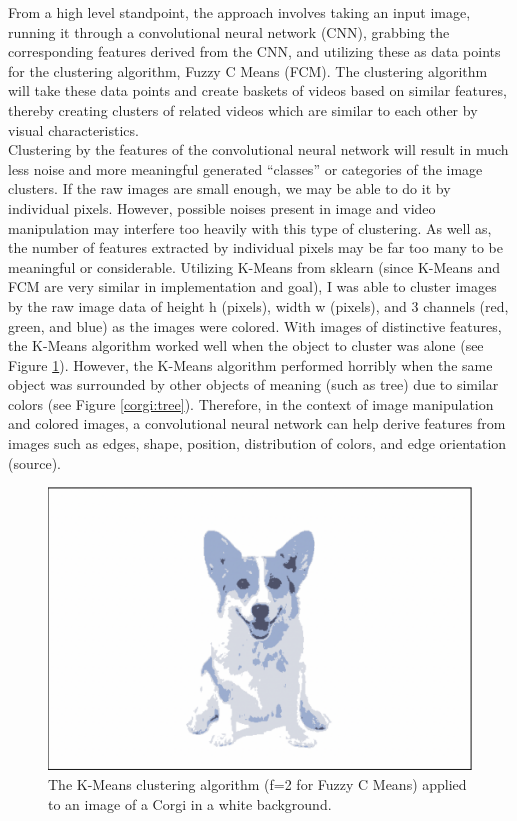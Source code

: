 \documentclass[10pt,twocolumn]{article}
\begin{document}
From a high level standpoint, the approach involves taking an input image, running it through a convolutional neural network (CNN), grabbing the corresponding features derived from the CNN, and utilizing these as data points for the clustering algorithm, Fuzzy C Means (FCM). The clustering algorithm will take these data points and create baskets of videos based on similar features, thereby creating clusters of related videos which are similar to each other by visual characteristics. \\
\indent Clustering by the features of the convolutional neural network will result in much less noise and more meaningful generated “classes” or categories of the image clusters. If the raw images are small enough, we may be able to do it by individual pixels. However, possible noises present in image and video manipulation may interfere too heavily with this type of clustering. As well as, the number of features extracted by individual pixels may be far too many to be meaningful or considerable. Utilizing K-Means from sklearn (since K-Means and FCM are very similar in implementation and goal), I was able to cluster images by the raw image data of height h (pixels), width w (pixels), and 3 channels (red, green, and blue) as the images were colored. With images of distinctive features, the K-Means algorithm worked well when the object to cluster was alone (see Figure \ref{corgi:white}). However, the K-Means algorithm performed horribly when the same object was surrounded by other objects of meaning (such as tree) due to similar colors (see Figure \ref{corgi:tree}). Therefore, in the context of image manipulation and colored images, a convolutional neural network can help derive features from images such as edges, shape, position, distribution of colors, and edge orientation (source). \\
\begin{figure}[h]
  \centering
  \includegraphics[scale=0.2] {corgi_white}
  \vspace{20px}
  \caption{The K-Means clustering algorithm (f=2 for Fuzzy C Means) applied to an image of a Corgi in a white background.}
  \label{corgi:white}
\end{figure}
\end{document}
